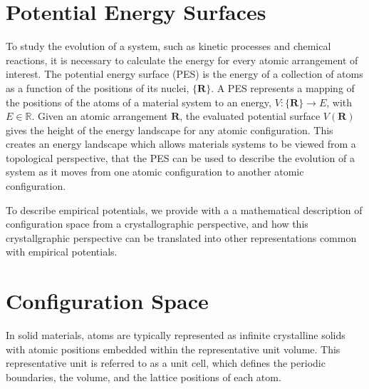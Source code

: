\section{Potential Energy Surfaces}

To study the evolution of a system, such as kinetic processes and chemical reactions, it is necessary to calculate the energy for every atomic arrangement of interest.  The potential energy surface (PES) is the energy of a collection of atoms as a function of the positions of its nuclei, $\{\bm{R}\}$.
A PES represents a mapping of the positions of the atoms of a material system to an energy, $V:\{\bm{R}\}\rightarrow E$, with $E\in\mathbb{R}$.
Given an atomic arrangement $\bm{R}$, the evaluated potential surface $V(\bm{R})$ gives the height of the energy landscape for any atomic configuration.
This creates an energy landscape which allows materials systems to be viewed from a topological perspective, that the PES can be used to describe the evolution of a system as it moves from one atomic configuration to another atomic configuration.

To describe empirical potentials, we provide with a a mathematical description of configuration space from a crystallographic perspective, and how this crystallgraphic perspective can be translated into other representations common with empirical potentials.

\section{Configuration Space}
\label{sec:configuration_space}
In solid materials, atoms are typically represented as infinite crystalline solids with atomic positions embedded within the representative unit volume.
This representative unit is referred to as a unit cell, which defines the periodic boundaries, the volume, and the lattice positions of each atom.

